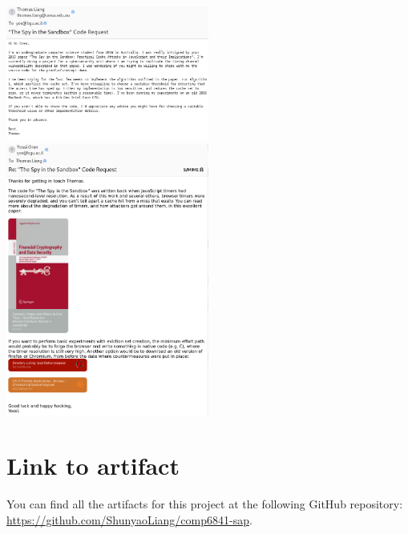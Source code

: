 \documentclass[a4paper,10pt,twocolumn]{article}
\theoremstyle{definition}
\begin{document}
\begin{center}
  \includegraphics[width=0.5\textwidth]{email-to-oren.png}
  \includegraphics[width=0.5\textwidth]{reply-from-oren.png}
\end{center}

\section{Link to artifact}

You can find all the artifacts for this project at the following GitHub
repository: \url{https://github.com/ShunyaoLiang/comp6841-sap}.

\printbibliography
\end{document}
